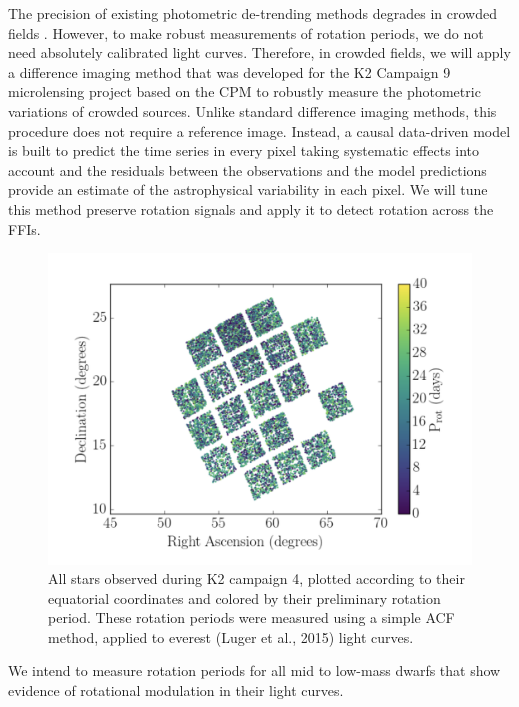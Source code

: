 \documentclass[useAMS, usenatbib, preprint, 12pt]{aastex}
\begin{document}
The precision of existing photometric de-trending methods degrades in crowded
fields \citep[for example,][]{luger2017}.
However, to make robust measurements of rotation periods, we do not need
absolutely calibrated light curves.
Therefore, in crowded fields, we will apply a difference imaging method that
was developed for the K2 Campaign 9 microlensing project \citep{henderson2016}
based on the \textsf{CPM} \citep{wang2016} to robustly measure the photometric
variations of crowded sources.
Unlike standard difference imaging methods, this procedure does not require a
reference image.
Instead, a causal data-driven model is built to predict the time series in
every pixel taking systematic effects into account and the residuals between
the observations and the model predictions provide an estimate of the
astrophysical variability in each pixel.
We will tune this method preserve rotation signals and apply it to detect
rotation across the FFIs.


\begin{figure}
\begin{center}
\includegraphics[width=6in, clip=true]{Kalesalad.png}
\caption{All stars observed during K2 campaign 4, plotted according to their
equatorial coordinates and colored by their preliminary rotation period.
These rotation periods were measured using a simple ACF method, applied to
    everest (Luger et al., 2015) light curves.}
\label{fig:kalesalad}
\end{center}
\end{figure}

We intend to measure rotation periods for all mid to low-mass dwarfs that show
evidence of rotational modulation in their light curves.
\end{document}
